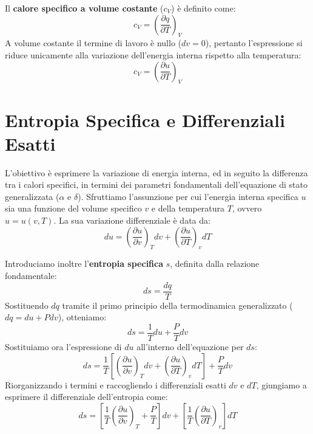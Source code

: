 Il \textbf{calore specifico a volume costante} ($c_V$) è definito come:
\begin{equation}
c_V = \left( \frac{\partial q}{\partial T} \right)_V
\end{equation}
A volume costante il termine di lavoro è nullo ($dv = 0$), pertanto l'espressione si riduce unicamente alla variazione dell'energia interna rispetto alla temperatura:
\begin{equation}
c_V = \left( \frac{\partial u}{\partial T} \right)_V
\end{equation}

\section{Entropia Specifica e Differenziali Esatti}

L'obiettivo è esprimere la variazione di energia interna, ed in seguito la differenza tra i calori specifici, in termini dei parametri fondamentali dell'equazione di stato generalizzata ($\alpha$ e $\delta$).
Sfruttiamo l'assunzione per cui l'energia interna specifica $u$ sia una funzione del volume specifico $v$ e della temperatura $T$, ovvero $u = u(v, T)$. La sua variazione differenziale è data da:
\begin{equation}
du = \left(\frac{\partial u}{\partial v}\right)_T dv + \left(\frac{\partial u}{\partial T}\right)_v dT
\end{equation}

Introduciamo inoltre l'\textbf{entropia specifica} $s$, definita dalla relazione fondamentale:
\begin{equation}
ds = \frac{dq}{T}
\end{equation}
Sostituendo $dq$ tramite il primo principio della termodinamica generalizzato ($dq = du + P dv$), otteniamo:
\begin{equation}
ds = \frac{1}{T} du + \frac{P}{T} dv
\end{equation}
Sostituiamo ora l'espressione di $du$ all'interno dell'equazione per $ds$:
\begin{equation}
ds = \frac{1}{T} \left[ \left(\frac{\partial u}{\partial v}\right)_T dv + \left(\frac{\partial u}{\partial T}\right)_v dT \right] + \frac{P}{T} dv
\end{equation}
Riorganizzando i termini e raccogliendo i differenziali esatti $dv$ e $dT$, giungiamo a esprimere il differenziale dell'entropia come:
\begin{equation}
ds = \left[ \frac{1}{T} \left(\frac{\partial u}{\partial v}\right)_T + \frac{P}{T} \right] dv + \left[ \frac{1}{T} \left(\frac{\partial u}{\partial T}\right)_v \right] dT
\end{equation}

